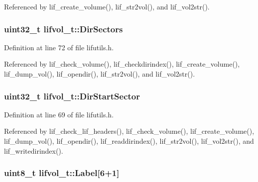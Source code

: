 Referenced by lif\+\_\+create\+\_\+volume(), lif\+\_\+str2vol(), and lif\+\_\+vol2str().

\subsubsection[{\texorpdfstring{Dir\+Sectors}{DirSectors}}]{\setlength{\rightskip}{0pt plus 5cm}uint32\+\_\+t lifvol\+\_\+t\+::\+Dir\+Sectors}\hypertarget{structlifvol__t_aceac3bc67cda1f79d91c002411e33897}{}\label{structlifvol__t_aceac3bc67cda1f79d91c002411e33897}


Definition at line 72 of file lifutils.\+h.



Referenced by lif\+\_\+check\+\_\+volume(), lif\+\_\+checkdirindex(), lif\+\_\+create\+\_\+volume(), lif\+\_\+dump\+\_\+vol(), lif\+\_\+opendir(), lif\+\_\+str2vol(), and lif\+\_\+vol2str().

\subsubsection[{\texorpdfstring{Dir\+Start\+Sector}{DirStartSector}}]{\setlength{\rightskip}{0pt plus 5cm}uint32\+\_\+t lifvol\+\_\+t\+::\+Dir\+Start\+Sector}\hypertarget{structlifvol__t_a89b86c990a7843cfa2addfff9a775137}{}\label{structlifvol__t_a89b86c990a7843cfa2addfff9a775137}


Definition at line 69 of file lifutils.\+h.



Referenced by lif\+\_\+check\+\_\+lif\+\_\+headers(), lif\+\_\+check\+\_\+volume(), lif\+\_\+create\+\_\+volume(), lif\+\_\+dump\+\_\+vol(), lif\+\_\+opendir(), lif\+\_\+readdirindex(), lif\+\_\+str2vol(), lif\+\_\+vol2str(), and lif\+\_\+writedirindex().

\subsubsection[{\texorpdfstring{Label}{Label}}]{\setlength{\rightskip}{0pt plus 5cm}uint8\+\_\+t lifvol\+\_\+t\+::\+Label\mbox{[}6+1\mbox{]}}\hypertarget{structlifvol__t_abbccb2f637812a31d24aa1f6725194be}{}\label{structlifvol__t_abbccb2f637812a31d24aa1f6725194be}


